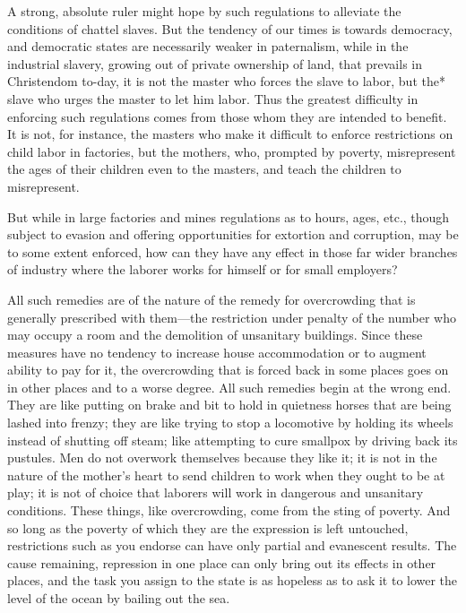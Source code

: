 \documentclass{book}
\begin{document}
A strong, absolute ruler might hope by such regulations to alleviate the conditions of chattel slaves. But the tendency of our times is towards democracy, and democratic states are necessarily weaker in paternalism, while in the industrial slavery, growing out of private ownership of land, that prevails in Christendom to-day, it is not the master who forces the slave to labor, but the* slave who urges the master to let him labor. Thus the greatest difficulty in enforcing such regulations comes from those whom they are intended to benefit. It is not, for instance, the masters who make it difficult to enforce restrictions on child labor in factories, but the mothers, who, prompted by poverty, misrepresent the ages of their children even to the masters, and teach the children to misrepresent.

But while in large factories and mines regulations as to hours, ages, etc., though subject to evasion and offering opportunities for extortion and corruption, may be to some extent enforced, how can they have any effect in those far wider branches of industry where the laborer works for himself or for small employers?

All such remedies are of the nature of the remedy for overcrowding that is generally prescribed with them—the restriction under penalty of the number who may occupy a room and the demolition of unsanitary buildings. Since these measures have no tendency to increase house accommodation or to augment ability to pay for it, the overcrowding that is forced back in some places goes on in other places and to a worse degree. All such remedies begin at the wrong end. They are like putting on brake and bit to hold in quietness horses that are being lashed into frenzy; they are like trying to stop a locomotive by holding its wheels instead of shutting off steam; like attempting to cure smallpox by driving back its pustules. Men do not overwork themselves because they like it; it is not in the nature of the mother’s heart to send children to work when they ought to be at play; it is not of choice that laborers will work in dangerous and unsanitary conditions. These things, like overcrowding, come from the sting of poverty. And so long as the poverty of which they are the expression is left untouched, restrictions such as you endorse can have only partial and evanescent results. The cause remaining, repression in one place can only bring out its effects in other places, and the task you assign to the state is as hopeless as to ask it to lower the level of the ocean by bailing out the sea.
\end{document}
